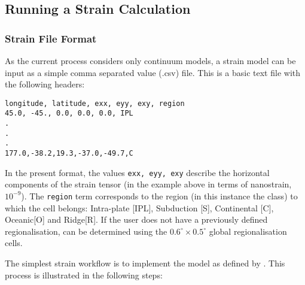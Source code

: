  
 \subsection{Running a Strain Calculation}
 \subsubsection{Strain File Format}
 
 As the current process considers only continuum models, a strain model can be input as a simple comma separated value (.csv) file. This is a basic text file with the following headers:
 
\begin{Verbatim}[frame=single, commandchars=\\\{\}, fontsize=\scriptsize]
longitude, latitude, exx, eyy, exy, region
45.0, -45., 0.0, 0.0, 0.0, IPL
.
.
.
177.0,-38.2,19.3,-37.0,-49.7,C
\end{Verbatim}

In the present format, the values \verb=exx, eyy, exy= describe the horizontal components of the strain tensor (in the example above in terms of nanostrain, $10^{-9}$). The \verb=region= term corresponds to the region (in this instance the \cite{Kreemer_etal2003} class) to which the cell belongs: Intra-plate [IPL], Subduction [S], Continental [C], Oceanic[O] and Ridge[R]. If the user does not have a previously defined regionalisation, can be determined using the $0.6^{\circ} \times 0.5^{\circ}$ global regionalisation cells.

The simplest strain workflow is to implement the model as defined by \cite{Bird_etal2010}. This process is illustrated in the following steps:

